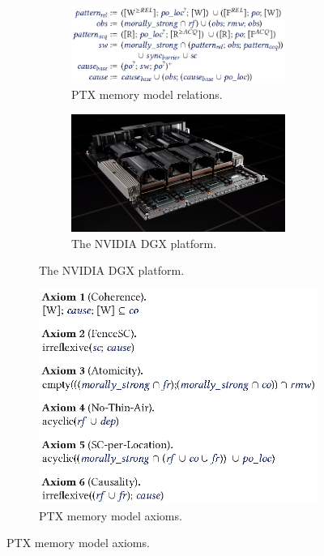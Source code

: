 \documentclass[acmsmall]{acmart}
\begin{document}
\begin{figure}[H]
    \centering
    \begin{subfigure}[b]{0.45\linewidth}
        \centering
        \begin{subfigure}[b]{\linewidth}
            \centering
            \includegraphics[width=\linewidth]{images/relations.eps}
            \caption{PTX memory model relations.}
            \label{fig:ptx-relations}
        \end{subfigure}
        \vfill
        \begin{subfigure}[b]{\linewidth}
            \centering
            \includegraphics[width=0.55\linewidth]{images/dgx.png}
            \caption{The NVIDIA DGX platform.}
            \label{fig:dgx}
        \end{subfigure}
    \end{subfigure}
    \hspace{10pt} %
    \begin{subfigure}[b]{0.45\linewidth}
        \centering
        \includegraphics[width=\linewidth]{images/axioms.eps}
        \caption{PTX memory model axioms.}
        \label{fig:ptx-axioms}
    \end{subfigure}
\end{figure}
\end{document}
